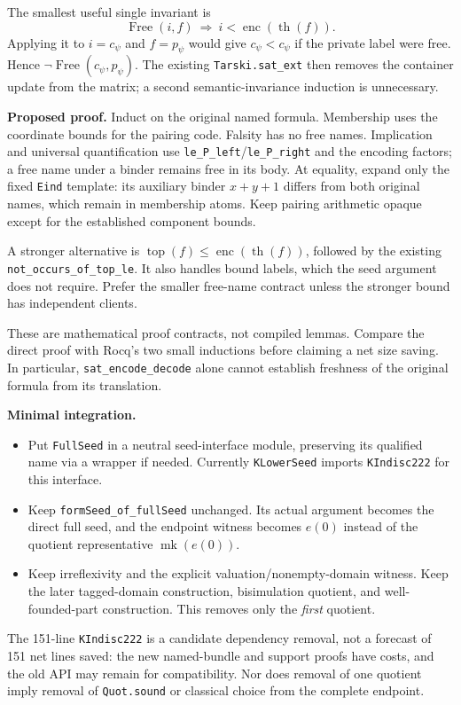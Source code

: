 \documentclass[10pt]{article}
\newcommand{\code}[1]{\texttt{#1}}
\begin{document}
The smallest useful single invariant is
\[
\operatorname{Free}(i,f)\ \Longrightarrow\ i<\operatorname{enc}(\operatorname{th}(f)).
\]
Applying it to $i=c_\psi$ and $f=p_\psi$ would give $c_\psi<c_\psi$ if the private label were free. Hence $\neg\operatorname{Free}(c_\psi,p_\psi)$. The existing \code{Tarski.sat\_ext} then removes the container update from the matrix; a second semantic-invariance induction is unnecessary.

\textbf{Proposed proof.} Induct on the original named formula. Membership uses the coordinate bounds for the pairing code. Falsity has no free names. Implication and universal quantification use \code{le\_P\_left}/\code{le\_P\_right} and the encoding factors; a free name under a binder remains free in its body. At equality, expand only the fixed \code{Eind} template: its auxiliary binder $x+y+1$ differs from both original names, which remain in membership atoms. Keep pairing arithmetic opaque except for the established component bounds.

A stronger alternative is $\operatorname{top}(f)\leq\operatorname{enc}(\operatorname{th}(f))$, followed by the existing \code{not\_occurs\_of\_top\_le}. It also handles bound labels, which the seed argument does not require. Prefer the smaller free-name contract unless the stronger bound has independent clients.

These are mathematical proof contracts, not compiled lemmas. Compare the direct proof with Rocq's two small inductions before claiming a net size saving. In particular, \code{sat\_encode\_decode} alone cannot establish freshness of the original formula from its translation.

\textbf{Minimal integration.}
\begin{itemize}
\item Put \code{FullSeed} in a neutral seed-interface module, preserving its qualified name via a wrapper if needed. Currently \code{KLowerSeed} imports \code{KIndisc222} for this interface.
\item Keep \code{formSeed\_of\_fullSeed} unchanged. Its actual argument becomes the direct full seed, and the endpoint witness becomes $e(0)$ instead of the quotient representative $\operatorname{mk}(e(0))$.
\item Keep irreflexivity and the explicit valuation/nonempty-domain witness. Keep the later tagged-domain construction, bisimulation quotient, and well-founded-part construction. This removes only the \emph{first} quotient.
\end{itemize}
The 151-line \code{KIndisc222} is a candidate dependency removal, not a forecast of 151 net lines saved: the new named-bundle and support proofs have costs, and the old API may remain for compatibility. Nor does removal of one quotient imply removal of \code{Quot.sound} or classical choice from the complete endpoint.
\end{document}
